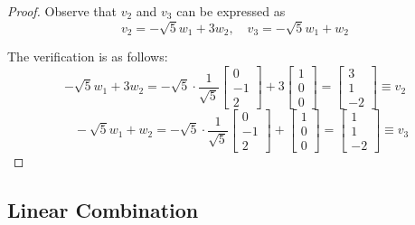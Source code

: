 \documentclass{article}
\theoremstyle{named}
\begin{document}
\begin{proof}
    Observe that $v_2$ and $v_3$ can be expressed as
    \[
        v_2 = -\sqrt{5}w_1 + 3w_2, \quad v_3 = -\sqrt{5}w_1 + w_2
    \]

    The verification is as follows:
    \[
        -\sqrt{5}w_1 + 3w_2 = -\sqrt{5} \cdot \frac{1}{\sqrt{5}}\begin{bmatrix} 0 \\ -1 \\ 2 \end{bmatrix} + 3\begin{bmatrix} 1 \\ 0 \\ 0 \end{bmatrix} = \begin{bmatrix} 3 \\ 1 \\ -2 \end{bmatrix} \equiv v_2
    \]
    \[
        \quad -\sqrt{5}w_1 + w_2 = -\sqrt{5} \cdot \frac{1}{\sqrt{5}} \begin{bmatrix} 0 \\ -1 \\ 2 \end{bmatrix} + \begin{bmatrix} 1 \\ 0 \\ 0 \end{bmatrix} = \begin{bmatrix} 1 \\ 1 \\ -2 \end{bmatrix} \equiv v_3
    \]
\end{proof}

\subsection{Linear Combination}
\end{document}
